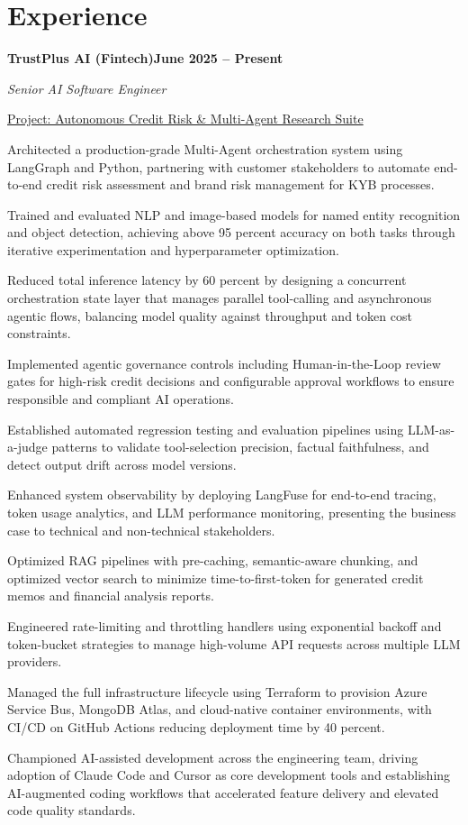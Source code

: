 \documentclass[letterpaper,10pt]{article}
\newcommand{\headingBf}[2]{\par\noindent\hspace*{10pt}\textbf{#1}\hfill\textbf{#2}}
\newcommand{\headingIt}[2]{\par\noindent\hspace*{10pt}\textit{#1}\hfill\textit{#2}}
\newenvironment{resume_list}{\vspace{-7pt}\begin{itemize}[itemsep=-2pt, parsep=1pt, leftmargin=30pt]}{\end{itemize}}
\newcommand{\itemTitle}[1]{\item[] \underline{#1}\vspace{4pt}}
\begin{document}
  \section{Experience}

  \headingBf{TrustPlus AI (Fintech)}{June 2025 -- Present}
  \headingIt{Senior AI Software Engineer}{}
  \begin{resume_list}
    \itemTitle{Project: Autonomous Credit Risk \& Multi-Agent Research Suite}
    \item Architected a production-grade Multi-Agent orchestration system using LangGraph and Python, partnering with customer stakeholders to automate end-to-end credit risk assessment and brand risk management for KYB processes.
    \item Trained and evaluated NLP and image-based models for named entity recognition and object detection, achieving above 95 percent accuracy on both tasks through iterative experimentation and hyperparameter optimization.
    \item Reduced total inference latency by 60 percent by designing a concurrent orchestration state layer that manages parallel tool-calling and asynchronous agentic flows, balancing model quality against throughput and token cost constraints.
    \item Implemented agentic governance controls including Human-in-the-Loop review gates for high-risk credit decisions and configurable approval workflows to ensure responsible and compliant AI operations.
    \item Established automated regression testing and evaluation pipelines using LLM-as-a-judge patterns to validate tool-selection precision, factual faithfulness, and detect output drift across model versions.
    \item Enhanced system observability by deploying LangFuse for end-to-end tracing, token usage analytics, and LLM performance monitoring, presenting the business case to technical and non-technical stakeholders.
    \item Optimized RAG pipelines with pre-caching, semantic-aware chunking, and optimized vector search to minimize time-to-first-token for generated credit memos and financial analysis reports.
    \item Engineered rate-limiting and throttling handlers using exponential backoff and token-bucket strategies to manage high-volume API requests across multiple LLM providers.
    \item Managed the full infrastructure lifecycle using Terraform to provision Azure Service Bus, MongoDB Atlas, and cloud-native container environments, with CI/CD on GitHub Actions reducing deployment time by 40 percent.
    \item Championed AI-assisted development across the engineering team, driving adoption of Claude Code and Cursor as core development tools and establishing AI-augmented coding workflows that accelerated feature delivery and elevated code quality standards.
  \end{resume_list}
\end{document}
